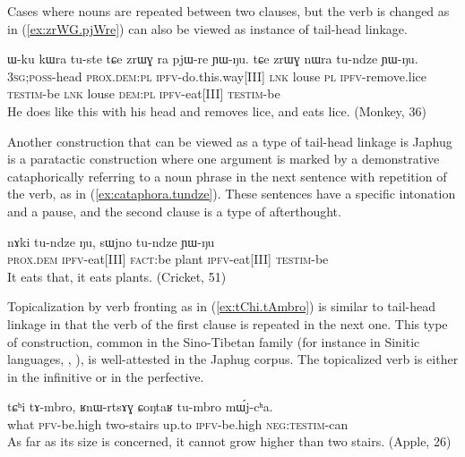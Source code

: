\documentclass[oldfontcommands,oneside,a4paper,11pt]{article}
\newcommand{\ipa}[1]{{\phon \mbox{#1}}} %
\newcommand{\refb}[1]{(\ref{#1})}
\begin{document}
Cases where nouns are repeated between two clauses, but the verb is changed as in \refb{ex:zrWG.pjWre} can also be viewed as instance of tail-head linkage.

\begin{exe}
\ex \label{ex:zrWG.pjWre}
\gll
\ipa{ɯ-ku} 	\ipa{kɯra} 	\ipa{tu-ste} 	\ipa{tɕe} 	\ipa{zrɯɣ} 	\ipa{ra} 	\ipa{pjɯ-re} 	\ipa{ɲɯ-ŋu.} 	\ipa{tɕe} 	\ipa{zrɯɣ} 	\ipa{nɯra} 	\ipa{tu-ndze} 	\ipa{ɲɯ-ŋu.} \\
\textsc{3sg;poss}-head \textsc{prox.dem:pl} \textsc{ipfv}-do.this.way[III] \textsc{lnk} louse \textsc{pl} \textsc{ipfv}-remove.lice \textsc{testim}-be  \textsc{lnk} louse \textsc{dem:pl}  \textsc{ipfv}-eat[III] \textsc{testim}-be \\
\glt He does like this with his head and removes lice, and eats lice. (Monkey, 36)
 \end{exe}

 
 

Another construction that can be viewed as a type of tail-head linkage is Japhug is a paratactic construction where one argument is marked by a demonstrative cataphorically referring to a noun phrase in the next sentence with repetition of the verb, as in \refb{ex:cataphora.tundze}. These sentences have a specific intonation and a pause, and the second clause is a type of afterthought.

\begin{exe}
\ex \label{ex:cataphora.tundze}
\gll
\ipa{nɤki} 	\ipa{tu-ndze} 	\ipa{ŋu,} 	\ipa{sɯjno} 	\ipa{tu-ndze} 	\ipa{ɲɯ-ŋu} \\
\textsc{prox.dem} \textsc{ipfv}-eat[III] \textsc{fact}:be plant \textsc{ipfv}-eat[III] \textsc{testim}-be \\
\glt It eats that, it eats plants. (Cricket, 51)
\end{exe}
 
Topicalization by verb fronting as in \refb{ex:tChi.tAmbro} is similar to tail-head linkage in that the verb of the first clause is repeated in the next one. This type of construction, common in the Sino-Tibetan family (for instance in Sinitic languages, \citealt{paris81syntaxe}, \citealt[76]{matthews94cantonese}), is well-attested in the Japhug corpus. The topicalized verb is either in the infinitive or in the perfective.

\begin{exe}
\ex \label{ex:tChi.tAmbro}
\gll
\ipa{tɕʰi} 	\ipa{tɤ-mbro,} 	\ipa{ʁnɯ-rtsɤɣ} 	\ipa{ɕoŋtaʁ} 	\ipa{tu-mbro} 	\ipa{mɯ́j-cʰa.}\\
what \textsc{pfv}-be.high two-stairs up.to \textsc{ipfv}-be.high \textsc{neg:testim}-can\\
\glt As far as its size is concerned, it cannot grow higher than two stairs. (Apple, 26)
\end{exe}
\end{document}
